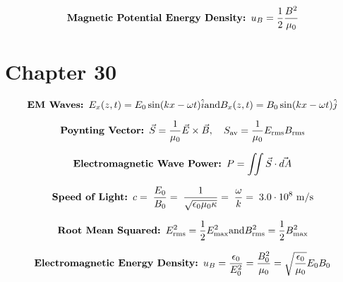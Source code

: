 \documentclass[fleqn,12pt]{article}
\begin{document}
\begin{equation}
    \label{eq3}
    \mbox{\textbf{Magnetic Potential Energy Density: }}u_B = \frac{1}{2}\frac{B^2}{\mu_0}
\end{equation}

\section*{Chapter 30}

\begin{equation}
    \label{eq3}
    \mbox{\textbf{EM Waves: }}
    {E_x}(z,t) = {E_0}\sin(kx - \omega t)\hat{i} \\ \mbox{and} \\ {B_x}(z,t) = {B_0}\sin(kx - \omega t)\hat{j}
\end{equation}


\begin{equation}
    \label{eq3}
    \mbox{\textbf{Poynting Vector: }}
    \vec{S} = \frac{1}{\mu_0}\vec{E} \times \vec{B},\quad S_\mathrm{av} = \frac{1}{\mu_0}E_\mathrm{rms}B_\mathrm{rms}
\end{equation}

\begin{equation}
    \label{eq3}
    \mbox{\textbf{Electromagnetic Wave Power: }}
    P = \iint \vec{S} \cdot \vec{dA}
\end{equation}

\begin{equation}
    \label{eq3}
    \mbox{\textbf{Speed of Light: }}
    c = \; \frac{E_0}{B_0} = \; \frac{1}{\sqrt{\epsilon_0\mu_0\kappa}} = \; \frac{\omega}{k}  = \; 3.0 \cdot 10^8 \  \si{\meter\per\second}
\end{equation}

\begin{equation}
    \label{eq3}
    \mbox{\textbf{Root Mean Squared: }}
    E_\mathrm{rms}^{2} = \frac{1}{2}E_\mathrm{max}^2 \\ \mbox{and} \\ B_\mathrm{rms}^{2} = \frac{1}{2}B_\mathrm{max}^2
\end{equation}

\begin{equation}
    \label{eq3}
    \mbox{\textbf{Electromagnetic Energy Density: }}
    u_B = \frac{\epsilon_0}{E_{0}^2} = \frac{B_0^2}{\mu_0} = \sqrt{\frac{\epsilon_0}{\mu_0}}E_0 B_0
\end{equation}
\end{document}
